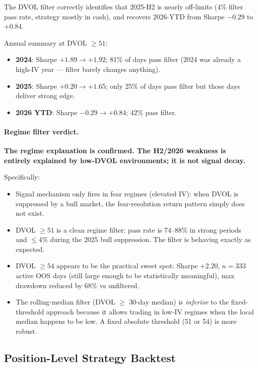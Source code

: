 \documentclass[12pt, a4paper]{article}
\theoremstyle{definition}
\begin{document}
The DVOL filter correctly identifies that 2025-H2 is nearly off-limits (4\%
filter pass rate, strategy mostly in cash), and recovers 2026-YTD from
Sharpe $-0.29$ to $+0.84$.

Annual summary at DVOL $\geq 51$:
\begin{itemize}[noitemsep]
  \item \textbf{2024}: Sharpe $+1.89 \to +1.92$; 81\% of days pass filter
        (2024 was already a high-IV year --- filter barely changes anything).
  \item \textbf{2025}: Sharpe $+0.20 \to +1.65$; only 25\% of days pass
        filter but those days deliver strong edge.
  \item \textbf{2026 YTD}: Sharpe $-0.29 \to +0.84$; 42\% pass filter.
\end{itemize}

\paragraph{Regime filter verdict.}

\textbf{The regime explanation is confirmed.  The H2/2026 weakness is entirely
explained by low-DVOL environments; it is not signal decay.}

Specifically:
\begin{itemize}[noitemsep]
  \item Signal mechanism only fires in fear regimes (elevated IV): when
        DVOL is suppressed by a bull market, the fear-resolution return
        pattern simply does not exist.
  \item DVOL $\geq 51$ is a clean regime filter: pass rate is 74--88\% in
        strong periods and $\leq 4\%$ during the 2025 bull suppression.
        The filter is behaving exactly as expected.
  \item DVOL $\geq 54$ appears to be the practical sweet spot: Sharpe $+2.20$,
        $n = 333$ active OOS days (still large enough to be statistically
        meaningful), max drawdown reduced by $68\%$ vs unfiltered.
  \item The rolling-median filter (DVOL $\geq$ 30-day median) is \emph{inferior}
        to the fixed-threshold approach because it allows trading in
        low-IV regimes when the local median happens to be low.
        A fixed absolute threshold (51 or 54) is more robust.
\end{itemize}

\subsection{Position-Level Strategy Backtest}
\label{sec:backtest}
\end{document}
